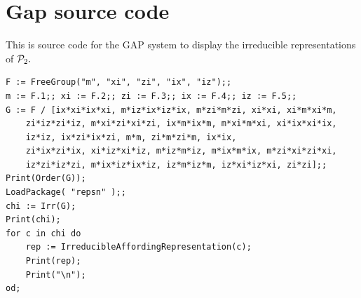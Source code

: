 \documentclass[12pt,notitlepage,longbibliography,nofootinbib,tightenlines]{revtex4}
\begin{document}
\appendix

\section{Gap source code}

This is source code for the GAP system \cite{GAP4} to display
the irreducible representations of $\mathcal{P}_2.$

\begin{verbatim}
F := FreeGroup("m", "xi", "zi", "ix", "iz");;
m := F.1;; xi := F.2;; zi := F.3;; ix := F.4;; iz := F.5;;
G := F / [ix*xi*ix*xi, m*iz*ix*iz*ix, m*zi*m*zi, xi*xi, xi*m*xi*m, 
    zi*iz*zi*iz, m*xi*zi*xi*zi, ix*m*ix*m, m*xi*m*xi, xi*ix*xi*ix, 
    iz*iz, ix*zi*ix*zi, m*m, zi*m*zi*m, ix*ix, 
    zi*ix*zi*ix, xi*iz*xi*iz, m*iz*m*iz, m*ix*m*ix, m*zi*xi*zi*xi, 
    iz*zi*iz*zi, m*ix*iz*ix*iz, iz*m*iz*m, iz*xi*iz*xi, zi*zi];;
Print(Order(G));
LoadPackage( "repsn" );;
chi := Irr(G);
Print(chi);
for c in chi do
    rep := IrreducibleAffordingRepresentation(c);
    Print(rep);
    Print("\n");
od;
\end{verbatim}


{}

\end{document}
